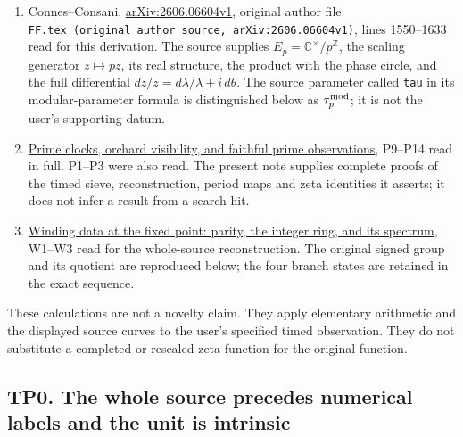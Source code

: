 \documentclass[
]{article}
\providecommand{\tightlist}{%
  \setlength{\itemsep}{0pt}\setlength{\parskip}{0pt}}
\begin{document}
\begin{enumerate}
\def\labelenumi{\arabic{enumi}.}
\tightlist
\item
  Connes--Consani,
  \href{https://arxiv.org/html/2606.06604v1}{arXiv:2606.06604v1},
  original author file
  \texttt{FF.tex\ (original\ author\ source,\ arXiv:2606.06604v1)},
  lines 1550--1633 read for this derivation. The source supplies
  \(E_p=\mathbb C^\times/p^{\mathbb Z}\), the scaling generator
  \(z\mapsto pz\), its real structure, the product with the phase
  circle, and the full differential
  \(dz/z=d\lambda/\lambda+i\,d\theta\). The source parameter called
  \texttt{tau} in its modular-parameter formula is distinguished below
  as \(\tau_p^{\rm mod}\); it is not the user's supporting datum.
\item
  \href{https://github.com/KokunoYumeto/zeta-function-research-reader/blob/6bc7202eceb05d1a482d495ad302803a80b5aeca/workbenches/splitzero-tandem/temporary-arguments/20260924-fixed-generic-point-purity/prime-clocks-p14/PRIME_CLOCKS_ORCHARD_AND_SPECTRUM.md}{Prime
  clocks, orchard visibility, and faithful prime observations}, P9--P14
  read in full. P1--P3 were also read. The present note supplies
  complete proofs of the timed sieve, reconstruction, period maps and
  zeta identities it asserts; it does not infer a result from a search
  hit.
\item
  \href{https://github.com/KokunoYumeto/zeta-function-research-reader/blob/6bc7202eceb05d1a482d495ad302803a80b5aeca/workbenches/splitzero-tandem/temporary-arguments/20260924-fixed-generic-point-purity/prime-clocks-p14/WINDING_PARITY_AND_INTEGER_SPECTRUM.md}{Winding
  data at the fixed point: parity, the integer ring, and its spectrum},
  W1--W3 read for the whole-source reconstruction. The original signed
  group and its quotient are reproduced below; the four branch states
  are retained in the exact sequence.
\end{enumerate}

These calculations are not a novelty claim. They apply elementary
arithmetic and the displayed source curves to the user's specified timed
observation. They do not substitute a completed or rescaled zeta
function for the original function.

\subsection{TP0. The whole source precedes numerical labels and the unit
is
intrinsic}\label{tp0.-the-whole-source-precedes-numerical-labels-and-the-unit-is-intrinsic}
\end{document}
